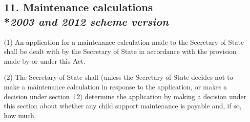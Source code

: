 \documentclass[12pt,a4paper]{article}
\begin{document}
\subsection[11. Maintenance calculations --- \emph{2003 and 2012 scheme version}]{11. Maintenance calculations\\*\emph{2003 and 2012 scheme version}}

(1) An application for a maintenance calculation made to the 
Secretary of State  %
shall be dealt with by 
the Secretary of State  %
in accordance with the provision made by or under this Act.

(2) The 
Secretary of State  %
shall (unless 
the Secretary of State  %
decides not to make a maintenance calculation in response to the application, or makes a decision under section~12) determine the application by making a decision under this section about whether any child support maintenance is payable and, if so, how much.

%
%
%
%
%
\end{document}
